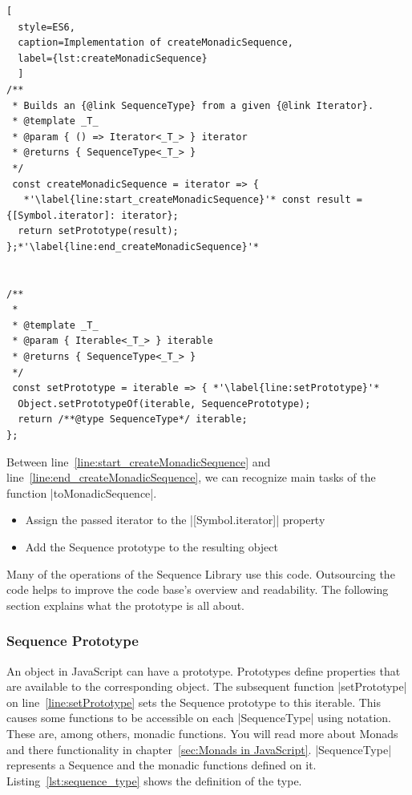 \begin{lstlisting}[
  style=ES6, 
  caption=Implementation of createMonadicSequence,
  label={lst:createMonadicSequence}
  ]
/**
 * Builds an {@link SequenceType} from a given {@link Iterator}.
 * @template _T_
 * @param { () => Iterator<_T_> } iterator
 * @returns { SequenceType<_T_> }
 */
 const createMonadicSequence = iterator => {
   *'\label{line:start_createMonadicSequence}'* const result = {[Symbol.iterator]: iterator};
  return setPrototype(result);
};*'\label{line:end_createMonadicSequence}'*


/**
 *
 * @template _T_
 * @param { Iterable<_T_> } iterable
 * @returns { SequenceType<_T_> }
 */
 const setPrototype = iterable => { *'\label{line:setPrototype}'*
  Object.setPrototypeOf(iterable, SequencePrototype);
  return /**@type SequenceType*/ iterable;
};
\end{lstlisting}

Between line~\ref{line:start_createMonadicSequence} and 
line~\ref{line:end_createMonadicSequence}, we can recognize main tasks of the
function |toMonadicSequence|.

\begin{itemize}
  \item{Assign the passed iterator to the |[Symbol.iterator]| property}
  \item{Add the Sequence prototype to the resulting object}
\end{itemize}

Many of the operations of the Sequence Library use this code.
Outsourcing the code helps to improve the code base's overview and readability.
The following section explains what the prototype is all about.

\subsubsection{Sequence Prototype}
\label{Sequence Prototype}
An object in JavaScript can have a prototype. Prototypes define properties 
that are available to the corresponding object. The subsequent
function |setPrototype| on line~\ref{line:setPrototype} sets the Sequence 
prototype to this iterable. This causes some functions to be accessible on each 
|SequenceType| using notation. These are, among others, monadic functions. You will read more
about Monads and there functionality in chapter~\ref{sec:Monads in JavaScript}. 
|SequenceType| represents a Sequence and the monadic functions defined on it. 
Listing~\ref{lst:sequence_type} shows the definition of the type.

